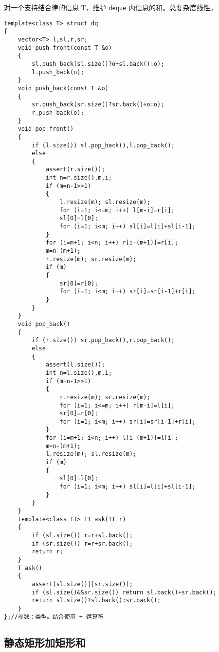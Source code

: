 \documentclass[12pt]{ctexart}
\begin{document}
对一个支持结合律的信息 T，维护 \verb|deque| 内信息的和。总复杂度线性。

\begin{lstlisting}
template<class T> struct dq
{
	vector<T> l,sl,r,sr;
	void push_front(const T &o)
	{
		sl.push_back(sl.size()?o+sl.back():o);
		l.push_back(o);
	}
	void push_back(const T &o)
	{
		sr.push_back(sr.size()?sr.back()+o:o);
		r.push_back(o);
	}
	void pop_front()
	{
		if (l.size()) sl.pop_back(),l.pop_back();
		else
		{
			assert(r.size());
			int n=r.size(),m,i;
			if (m=n-1>>1)
			{
				l.resize(m); sl.resize(m);
				for (i=1; i<=m; i++) l[m-i]=r[i];
				sl[0]=l[0];
				for (i=1; i<m; i++) sl[i]=l[i]+sl[i-1];
			}
			for (i=m+1; i<n; i++) r[i-(m+1)]=r[i];
			m=n-(m+1);
			r.resize(m); sr.resize(m);
			if (m)
			{
				sr[0]=r[0];
				for (i=1; i<m; i++) sr[i]=sr[i-1]+r[i];
			}
		}
	}
	void pop_back()
	{
		if (r.size()) sr.pop_back(),r.pop_back();
		else
		{
			assert(l.size());
			int n=l.size(),m,i;
			if (m=n-1>>1)
			{
				r.resize(m); sr.resize(m);
				for (i=1; i<=m; i++) r[m-i]=l[i];
				sr[0]=r[0];
				for (i=1; i<m; i++) sr[i]=sr[i-1]+r[i];
			}
			for (i=m+1; i<n; i++) l[i-(m+1)]=l[i];
			m=n-(m+1);
			l.resize(m); sl.resize(m);
			if (m)
			{
				sl[0]=l[0];
				for (i=1; i<m; i++) sl[i]=l[i]+sl[i-1];
			}
		}
	}
	template<class TT> TT ask(TT r)
	{
		if (sl.size()) r=r+sl.back();
		if (sr.size()) r=r+sr.back();
		return r;
	}
	T ask()
	{
		assert(sl.size()||sr.size());
		if (sl.size()&&sr.size()) return sl.back()+sr.back();
		return sl.size()?sl.back():sr.back();
	}
};//参数：类型。结合使用 + 运算符

\end{lstlisting}

\subsection{静态矩形加矩形和}
\end{document}

